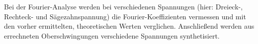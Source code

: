 Bei der Fourier-Analyse werden bei verschiedenen Spannungen (hier: Dreieck-, Rechteck- und Sägezahnspannung) die Fourier-Koeffizienten vermessen und mit den vorher ermittelten, theoretischen Werten verglichen. Anschließend werden aus errechneten Oberschwingungen verschiedene Spannungen synthetisiert.
